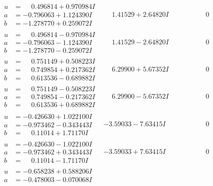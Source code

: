 \documentclass[1p]{elsarticle_modified}
\theoremstyle{definition}
\begin{document}
$$\begin{array}{c|c|c}
 \hline 
\begin{aligned}
u &= \phantom{-}0.496814 + 0.970984 I \\
a &= -0.796063 + 1.124390 I \\
b &= -1.278770 + 0.259072 I\end{aligned}
 & \phantom{-}1.41529 + 2.64820 I & \phantom{-0.000000 } 0 \\ \hline\begin{aligned}
u &= \phantom{-}0.496814 - 0.970984 I \\
a &= -0.796063 - 1.124390 I \\
b &= -1.278770 - 0.259072 I\end{aligned}
 & \phantom{-}1.41529 - 2.64820 I & \phantom{-0.000000 } 0 \\ \hline\begin{aligned}
u &= \phantom{-}0.751149 + 0.508223 I \\
a &= \phantom{-}0.749854 + 0.217362 I \\
b &= \phantom{-}0.613536 - 0.689882 I\end{aligned}
 & \phantom{-}6.29900 + 5.67352 I & \phantom{-0.000000 } 0 \\ \hline\begin{aligned}
u &= \phantom{-}0.751149 - 0.508223 I \\
a &= \phantom{-}0.749854 - 0.217362 I \\
b &= \phantom{-}0.613536 + 0.689882 I\end{aligned}
 & \phantom{-}6.29900 - 5.67352 I & \phantom{-0.000000 } 0 \\ \hline\begin{aligned}
u &= -0.426630 + 1.022100 I \\
a &= -0.973462 - 0.343443 I \\
b &= \phantom{-}0.11014 + 1.71170 I\end{aligned}
 & -3.59033 - 7.63415 I & \phantom{-0.000000 } 0 \\ \hline\begin{aligned}
u &= -0.426630 - 1.022100 I \\
a &= -0.973462 + 0.343443 I \\
b &= \phantom{-}0.11014 - 1.71170 I\end{aligned}
 & -3.59033 + 7.63415 I & \phantom{-0.000000 } 0 \\ \hline\begin{aligned}
u &= -0.658238 + 0.588206 I \\
a &= -0.478003 - 0.070068 I \\

\end{aligned}
\end{array}$$
\end{document}
